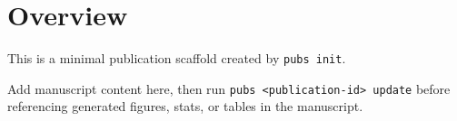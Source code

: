 \documentclass{article}
\begin{document}
\section*{Overview}

This is a minimal publication scaffold created by \texttt{pubs init}.

Add manuscript content here, then run \texttt{pubs <publication-id> update}
before referencing generated figures, stats, or tables in the manuscript.
\end{document}

